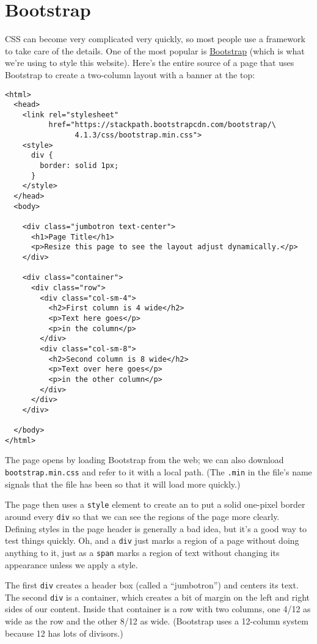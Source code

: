 \section{Bootstrap}\label{s:htmlcss-bootstrap}

CSS can become very complicated very quickly,
so most people use a framework to take care of the details.
One of the most popular is \href{https://getbootstrap.com/}{Bootstrap}
(which is what we're using to style this website).
Here's the entire source of a page that uses Bootstrap
to create a two-column layout with a banner at the top:

\begin{verbatim}
<html>
  <head>
    <link rel="stylesheet"
          href="https://stackpath.bootstrapcdn.com/bootstrap/\
                4.1.3/css/bootstrap.min.css">
    <style>
      div {
        border: solid 1px;
      }
    </style>
  </head>
  <body>

    <div class="jumbotron text-center">
      <h1>Page Title</h1>
      <p>Resize this page to see the layout adjust dynamically.</p>
    </div>

    <div class="container">
      <div class="row">
        <div class="col-sm-4">
          <h2>First column is 4 wide</h2>
          <p>Text here goes</p>
          <p>in the column</p>
        </div>
        <div class="col-sm-8">
          <h2>Second column is 8 wide</h2>
          <p>Text over here goes</p>
          <p>in the other column</p>
        </div>
      </div>
    </div>

  </body>
</html>
\end{verbatim}

The page opens by loading Bootstrap from the web;
we can also download \texttt{bootstrap.min.css} and refer to it with a local path.
(The \texttt{.min} in the file's name signals that the file has been 
so that it will load more quickly.)

The page then uses a \texttt{style} element to create an 
to put a solid one-pixel border around every \texttt{div}
so that we can see the regions of the page more clearly.
Defining styles in the page header is generally a bad idea,
but it's a good way to test things quickly.
Oh,
and a \texttt{div} just marks a region of a page without doing anything to it,
just as a \texttt{span} marks a region of text without changing its appearance
unless we apply a style.

The first \texttt{div} creates a header box (called a ``jumbotron'') and centers its text.
The second \texttt{div} is a container,
which creates a bit of margin on the left and right sides of our content.
Inside that container is a row with two columns,
one 4/12 as wide as the row and the other 8/12 as wide.
(Bootstrap uses a 12-column system because 12 has lots of divisors.)

